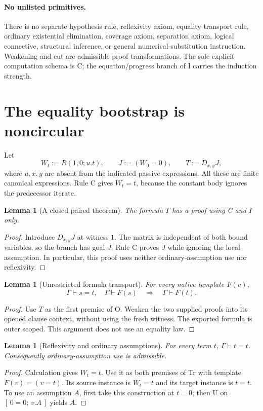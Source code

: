\documentclass[11pt]{article}
\newtheorem{lemma}[theorem]{Lemma}
\theoremstyle{definition}\newtheorem{definition}[theorem]{Definition}
\newcommand{\cl}[2]{[\,#1;\,#2\,]}
\begin{document}
\paragraph{No unlisted primitives.}
There is no separate hypothesis rule, reflexivity axiom, equality
transport rule, ordinary existential elimination, coverage axiom,
separation axiom, logical connective, structural inference, or general
numerical-substitution instruction. Weakening and cut are admissible
proof transformations. The sole explicit computation schema is C; the equation/progress
branch of I carries the induction strength.

\section{The equality bootstrap is noncircular}

Let
\[
 W_t:=R(1,0;u.t),\qquad J:=(W_0=0),\qquad
 T:=D_{x,y}J,
\]
where $u,x,y$ are absent from the indicated passive expressions.
All these are finite canonical expressions. Rule C gives $W_t=t$,
because the constant body ignores the predecessor iterate.

\begin{lemma}[A closed paired theorem]
The formula $T$ has a proof using C and I only.
\end{lemma}
\begin{proof}
Introduce $D_{x,y}J$ at witness $1$. The matrix is independent of both
bound variables, so the branch has goal $J$. Rule C proves $J$ while
ignoring the local assumption. In particular, this proof uses neither
ordinary-assumption use nor reflexivity.
\end{proof}

\begin{lemma}[Unrestricted formula transport]
For every native template $F(v)$,
\[
 \Gamma\vdash s=t,\quad\Gamma\vdash F(s)
 \quad\Longrightarrow\quad\Gamma\vdash F(t).
 \tag{Tr}\label{derived:tr}
\]
\end{lemma}
\begin{proof}
Use $T$ as the first premise of O. Weaken the two supplied proofs into
its opened clause context, without using the fresh witness. The exported
formula is outer scoped. This argument does not use an equality law.
\end{proof}

\begin{lemma}[Reflexivity and ordinary assumptions]
For every term $t$, $\Gamma\vdash t=t$. Consequently ordinary-assumption
use is admissible.
\end{lemma}
\begin{proof}
Calculation gives $W_t=t$. Use it as both premises of Tr with template
$F(v)=(v=t)$. Its source instance is $W_t=t$ and its target instance is
$t=t$. To use an assumption $A$, first take this construction at $t=0$;
then U on $\cl{0=0}{v.A}$ yields $A$.
\end{proof}
\end{document}
